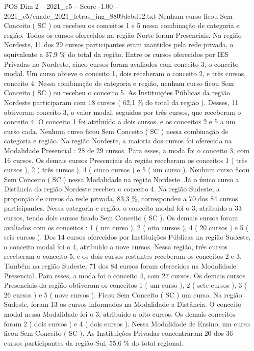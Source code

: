 \begin{textsample}{POS Dim 2 – 2021\_c5 – Score -1.00 – 2021\_c5/enade\_2021\_letras\_ing\_8809dcbd12.txt}
Nenhum curso ficou Sem Conceito ( SC ) ou recebeu os conceitos 1 e 5 nessa combinação de categoria e região.
Todos os cursos oferecidos na região Norte foram Presenciais.
Na região Nordeste, 11 dos 29 cursos participantes eram mantidos pela rede privada, o equivalente a 37,9 \% do total da região.
Entre os cursos oferecidos por IES Privadas no Nordeste, cinco cursos foram avaliados com conceito 3, o conceito modal.
Um curso obteve o conceito 1, dois receberam o conceito 2, e três cursos, conceito 4.
Nessa combinação de categoria e região, nenhum curso ficou Sem Conceito ( SC ) ou recebeu o conceito 5.
As Instituições Públicas da região Nordeste participaram com 18 cursos ( 62,1 \% do total da região ).
Desses, 11 obtiveram conceito 3, o valor modal, seguidos por três cursos, que receberam o conceito 4.
O conceito 1 foi atribuído a dois cursos, e os conceitos 2 e 5 a um curso cada.
Nenhum curso ficou Sem Conceito ( SC ) nessa combinação de categoria e região.
Na região Nordeste, a maioria dos cursos foi oferecida na Modalidade Presencial : 28 de 29 cursos.
Para esses, a moda foi o conceito 3, com 16 cursos.
Os demais cursos Presenciais da região receberam os conceitos 1 ( três cursos ), 2 ( três cursos ), 4 ( cinco cursos ) e 5 ( um curso ).
Nenhum curso ficou Sem Conceito ( SC ) nessa Modalidade na região Nordeste.
Já o único curso a Distância da região Nordeste recebeu o conceito 4.
Na região Sudeste, a proporção de cursos da rede privada, 83,3 \%, correspondeu a 70 dos 84 cursos participantes.
Nessa categoria e região, o conceito modal foi o 3, atribuído a 33 cursos, tendo dois cursos ficado Sem Conceito ( SC ).
Os demais cursos foram avaliados com os conceitos : 1 ( um curso ), 2 ( oito cursos ), 4 ( 20 cursos ) e 5 ( seis cursos ).
Dos 14 cursos oferecidos por Instituições Públicas na região Sudeste, o conceito modal foi o 4, atribuído a nove cursos.
Nessa região, três cursos receberam o conceito 5, e os dois cursos restantes receberam os conceitos 2 e 3.
Também na região Sudeste, 71 dos 84 cursos foram oferecidos na Modalidade Presencial.
Para esses, a moda foi o conceito 4, com 27 cursos.
Os demais cursos Presenciais da região obtiveram os conceitos 1 ( um curso ), 2 ( sete cursos ), 3 ( 26 cursos ) e 5 ( nove cursos ).
Ficou Sem Conceito ( SC ) um curso.
Na região Sudeste, foram 13 os cursos informados na Modalidade a Distância.
O conceito modal nessa Modalidade foi o 3, atribuído a oito cursos.
Os demais conceitos foram 2 ( dois cursos ) e 4 ( dois cursos ).
Nessa Modalidade de Ensino, um curso ficou Sem Conceito ( SC ).
As Instituições Privadas concentraram 20 dos 36 cursos participantes da região Sul, 55,6 \% do total regional.

\end{textsample}
